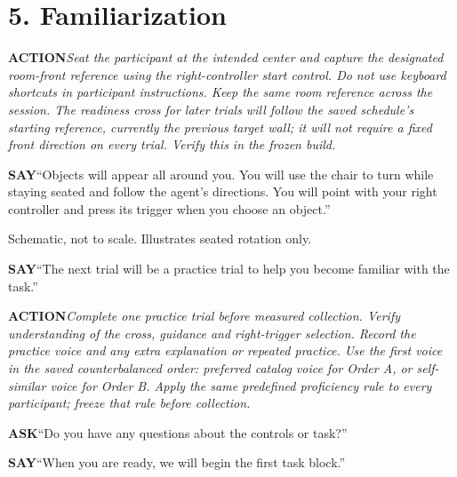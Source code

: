 \documentclass[11pt,letterpaper]{article}
\newcommand{\step}[1]{\Needspace{7\baselineskip}\section{#1}}
\newcommand{\say}[2]{\Needspace{4\baselineskip}\par\textbf{#1}\enspace #2\par}
\newcommand{\action}[2]{\Needspace{3\baselineskip}\par{\color{ActionInk}\textbf{#1}\enspace\textit{#2}}\par}
\begin{document}
\step{5. Familiarization}
\action{ACTION}{Seat the participant at the intended center and capture the designated room-front reference using the right-controller start control. Do not use keyboard shortcuts in participant instructions. Keep the same room reference across the session. The readiness cross for later trials will follow the saved schedule's starting reference, currently the previous target wall; it will not require a fixed front direction on every trial. Verify this in the frozen build.}
\say{SAY}{``Objects will appear all around you. You will use the chair to turn while staying seated and follow the agent's directions. You will point with your right controller and press its trigger when you choose an object.''}
\begin{center}

{\small\color{Gray}Schematic, not to scale. Illustrates seated rotation only.}
\end{center}
\say{SAY}{``The next trial will be a practice trial to help you become familiar with the task.''}
\action{ACTION}{Complete one practice trial before measured collection. Verify understanding of the cross, guidance and right-trigger selection. Record the practice voice and any extra explanation or repeated practice. Use the first voice in the saved counterbalanced order: preferred catalog voice for Order A, or self-similar voice for Order B. Apply the same predefined proficiency rule to every participant; freeze that rule before collection.}
\say{ASK}{``Do you have any questions about the controls or task?''}
\say{SAY}{``When you are ready, we will begin the first task block.''}
\end{document}
